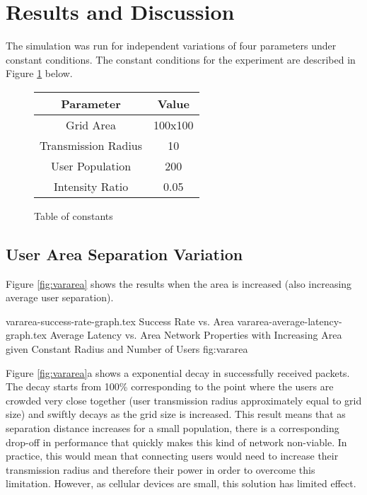 \section{Results and Discussion}
The simulation was run for independent variations of four parameters under constant conditions.
The constant conditions for the experiment are described in Figure \ref{fig:consttable} below.

\begin{figure}[!htb]
    \centering
    \begin{tabular}{c|c}
        \hline
        Parameter               & Value     \\
        \hline
        Grid Area               & 100x100   \\
        Transmission Radius     & 10        \\
        User Population         & 200       \\
        Intensity Ratio         & 0.05      \\
        \hline
    \end{tabular}
    \caption{Table of constants}
    \label{fig:consttable}
\end{figure}

\subsection{User Area Separation Variation}
Figure \ref{fig:vararea} shows the results when the area is increased
(also increasing average user separation).

\sidebysidefigures
{vararea-success-rate-graph.tex}       {Success Rate vs. Area}
{vararea-average-latency-graph.tex}    {Average Latency vs. Area}
{Network Properties with Increasing Area given Constant Radius and Number of Users}
{fig:vararea}

Figure \ref{fig:vararea}a shows a exponential decay in successfully received packets.
The decay starts from 100\% corresponding to the point where the users are crowded very close
together (user transmission radius approximately equal to grid size) and swiftly decays as
the grid size is increased.
This result means that as separation distance increases for a small population, there
is a corresponding drop-off in performance that quickly makes this kind of network non-viable.
In practice, this would mean that connecting users would need to increase their transmission radius
and therefore their power in order to overcome this limitation.
However, as cellular devices are small, this solution has limited effect.

